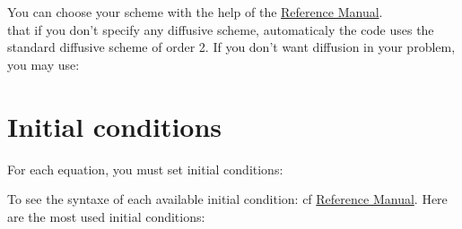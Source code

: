     \begin{center}
    \end{center}

You can choose your scheme with the help of the \href{TRUST_Reference_Manual.pdf\#blocdiffusion}{\trust Reference Manual}.\\

\Note that if you don't specify any diffusive scheme, automaticaly the code uses the standard diffusive scheme of order 2.
If you don't want diffusion in your problem, you may use:

    \begin{center}
    \end{center}






\section{Initial conditions}

For each equation, you must set initial conditions:

    \begin{center}
    \end{center}

To see the syntaxe of each available initial condition: cf \href{TRUST_Reference_Manual.pdf\#condinits}{\trust Reference Manual}.
Here are the most used initial conditions:

